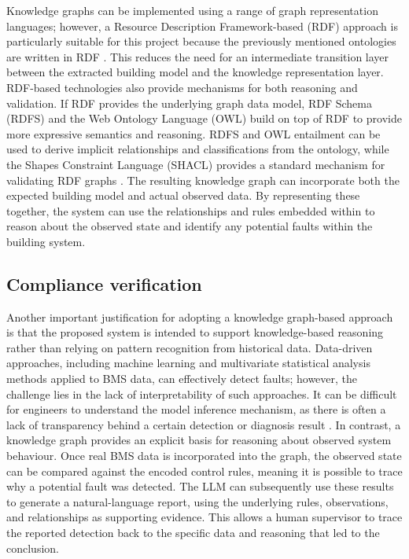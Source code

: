 \documentclass{article}
\begin{document}
Knowledge graphs can be implemented using a range of graph representation languages; however, a Resource Description Framework-based (RDF) approach is particularly suitable for this project because the previously mentioned ontologies are written in RDF \parencite{balaji2016,schneider2017,chen2026}. This reduces the need for an intermediate transition layer between the extracted building model and the knowledge representation layer. RDF-based technologies also provide mechanisms for both reasoning and validation. If RDF provides the underlying graph data model, RDF Schema (RDFS) and the Web Ontology Language (OWL) build on top of RDF to provide more expressive semantics and reasoning. RDFS and OWL entailment can be used to derive implicit relationships and classifications from the ontology, while the Shapes Constraint Language (SHACL) provides a standard mechanism for validating RDF graphs \parencite{knublauch2017}. The resulting knowledge graph can incorporate both the expected building model and actual observed data. By representing these together, the system can use the relationships and rules embedded within to reason about the observed state and identify any potential faults within the building system.

\subsection{Compliance verification}

Another important justification for adopting a knowledge graph-based approach is that the proposed system is intended to support knowledge-based reasoning rather than relying on pattern recognition from historical data. Data-driven approaches, including machine learning and multivariate statistical analysis methods applied to BMS data, can effectively detect faults; however, the challenge lies in the lack of interpretability of such approaches. It can be difficult for engineers to understand the model inference mechanism, as there is often a lack of transparency behind a certain detection or diagnosis result \parencite{chen2023}. In contrast, a knowledge graph provides an explicit basis for reasoning about observed system behaviour. Once real BMS data is incorporated into the graph, the observed state can be compared against the encoded control rules, meaning it is possible to trace why a potential fault was detected. The LLM can subsequently use these results to generate a natural-language report, using the underlying rules, observations, and relationships as supporting evidence. This allows a human supervisor to trace the reported detection back to the specific data and reasoning that led to the conclusion.
\end{document}

